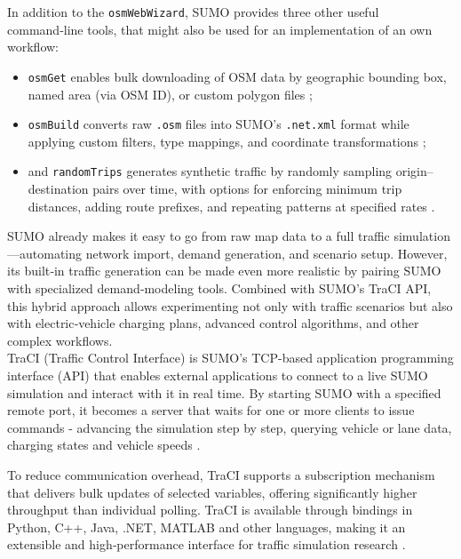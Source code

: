In addition to the \texttt{osmWebWizard}, SUMO provides three other useful command‑line tools, that might also be used for an implementation of an own workflow: 
\begin{itemize}
    \item \texttt{osmGet} enables bulk downloading of OSM data by geographic bounding box, named area (via OSM ID), or custom polygon files \cite{noauthor_osmwebwizard_nodate};
    \item \texttt{osmBuild} converts raw \texttt{.osm} files into SUMO’s \texttt{.net.xml} format while applying custom filters, type mappings, and coordinate transformations \cite{noauthor_osmwebwizard_nodate};
    \item and \texttt{randomTrips} generates synthetic traffic by randomly sampling origin–destination pairs over time, with options for enforcing minimum trip distances, adding route prefixes, and repeating patterns at specified rates \cite{noauthor_trip_nodate}.
\end{itemize}

SUMO already makes it easy to go from raw map data to a full traffic simulation—automating network import, demand generation, and scenario setup. However, its built‑in traffic generation can be made even more realistic by pairing SUMO with specialized demand‑modeling tools. Combined with SUMO’s TraCI API, this hybrid approach allows experimenting not only with traffic scenarios but also with electric‑vehicle charging plans, advanced control algorithms, and other complex workflows.\\

TraCI (Traffic Control Interface) is SUMO's TCP-based application programming interface (API) that enables external applications to connect to a live SUMO simulation and interact with it in real time. By starting SUMO with a specified remote port, it becomes a server that waits for one or more clients to issue commands - advancing the simulation step by step, querying vehicle or lane data, charging states and vehicle speeds \cite{noauthor_traci_nodate}.

To reduce communication overhead, TraCI supports a subscription mechanism that delivers bulk updates of selected variables, offering significantly higher throughput than individual polling.
TraCI is available through bindings in Python, C++, Java, .NET, MATLAB and other languages, making it an extensible and high‑performance interface for traffic simulation research \cite{noauthor_traci_nodate}.

